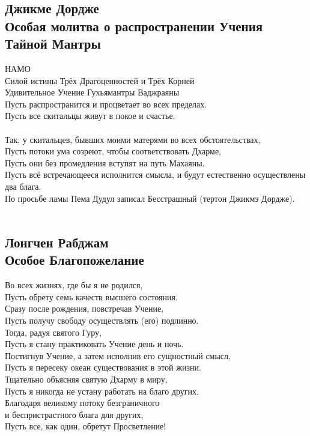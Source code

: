 \subsection{Джикме Дордже\\Особая молитва о распространении Учения Тайной Мантры}

НАМО\\
Силой истины Трёх Драгоценностей и Трёх Корней\\
Удивительное Учение Гухьямантры Ваджраяны\\
Пусть распространится и процветает во всех пределах.\\
Пусть все скитальцы живут в покое и счастье.\\
\\
Так, у скитальцев, бывших моими матерями во всех обстоятельствах,\\
Пусть потоки ума созреют, чтобы соответствовать Дхарме,\\
Пусть они без промедления вступят на путь Махаяны.\\
Пусть всё встречающееся исполнится смысла, и будут естественно осуществлены два блага.\\
По просьбе ламы Пема Дудул записал Бесстрашный (тертон Джикмэ Дордже).\\
\\

\subsection{Лонгчен Рабджам\\Особое Благопожелание}

Во всех жизнях, где бы я не родился,\\
Пусть обрету семь качеств высшего состояния.\\
Сразу после рождения, повстречав Учение,\\
Пусть получу свободу осуществлять (его) подлинно.\\
Тогда, радуя святого Гуру,\\
Пусть я стану практиковать Учение день и ночь.\\
Постигнув Учение, а затем исполнив его сущностный смысл,\\
Пусть я пересеку океан существования в этой жизни.\\
Тщательно объясняя святую Дхарму в миру,\\
Пусть я никогда не устану работать на благо других.\\
Благодаря великому потоку безграничного\\
и беспристрастного блага для других,\\
Пусть все, как один, обретут Просветление!

